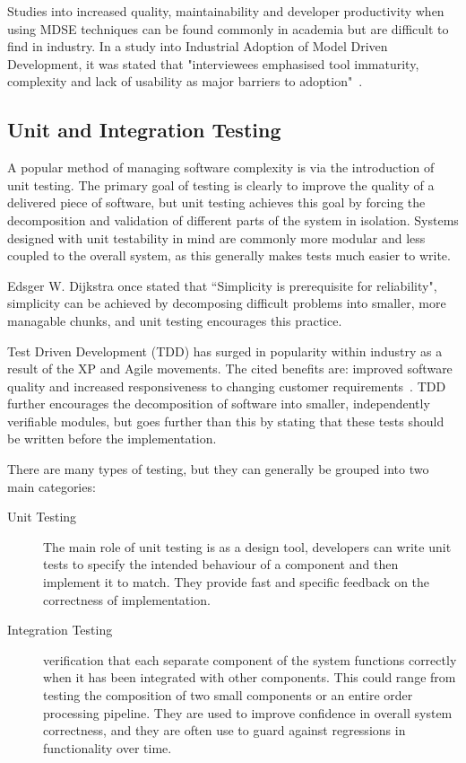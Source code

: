 \documentclass{cshonours}
\begin{document}
Studies into increased quality, maintainability and developer productivity when using MDSE techniques can be found commonly in academia but are difficult to find in industry. In a study into Industrial Adoption of Model Driven Development, it was stated that "interviewees emphasised tool immaturity, complexity and lack of usability as major barriers to adoption"~\cite{IndustryMDSE}.

\subsection{Unit and Integration Testing}

A popular method of managing software complexity is via the introduction of unit testing. The primary goal of testing is clearly to improve the quality of a delivered piece of software, but unit testing achieves this goal by forcing the decomposition and validation of different parts of the system in isolation. Systems designed with unit testability in mind are commonly more modular and less coupled to the overall system, as this generally makes tests much easier to write.

Edsger W. Dijkstra once stated that ``Simplicity is prerequisite for reliability", simplicity can be achieved by decomposing difficult problems into smaller, more managable chunks, and unit testing encourages this practice.

Test Driven Development (TDD) has surged in popularity within industry as a result of the XP and Agile movements. The cited benefits are: improved software quality and increased responsiveness to changing customer requirements~\cite{WikiXP}. TDD further encourages the decomposition of software into smaller, independently verifiable modules, but goes further than this by stating that these tests should be written before the implementation.

There are many types of testing, but they can generally be grouped into two main categories:

\begin{description}
  \item[Unit Testing] The main role of unit testing is as a design tool, developers can write unit tests to specify the intended behaviour of a component and then implement it to match. They provide fast and specific feedback on the correctness of implementation.
  \item[Integration Testing] verification that each separate component of the system functions correctly when it has been integrated with other components. This could range from testing the composition of two small components or an entire order processing pipeline. They are used to improve confidence in overall system correctness, and they are often use to guard against regressions in functionality over time.
\end{description}
\end{document}

